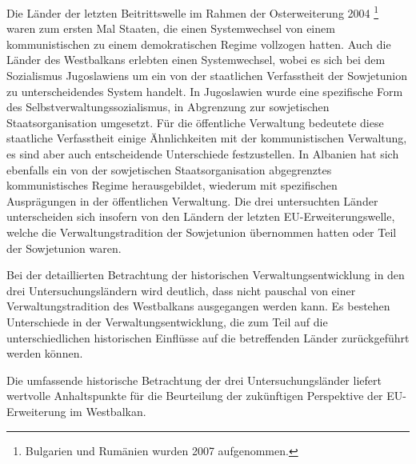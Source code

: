Die Länder der letzten Beitrittswelle im Rahmen der Osterweiterung 2004 \footnote{Bulgarien und Rumänien wurden 2007 aufgenommen.} waren zum ersten Mal Staaten, die einen Systemwechsel von einem kommunistischen zu einem demokratischen Regime vollzogen hatten. Auch die Länder des Westbalkans erlebten einen Systemwechsel, wobei es sich bei dem Sozialismus Jugoslawiens um ein von der staatlichen Verfasstheit der Sowjetunion zu unterscheidendes System handelt. In Jugoslawien wurde eine spezifische Form des Selbstverwaltungssozialismus, in Abgrenzung zur sowjetischen Staatsorganisation umgesetzt. Für die öffentliche Verwaltung bedeutete diese staatliche Verfasstheit einige Ähnlichkeiten mit der kommunistischen Verwaltung, es sind aber auch entscheidende Unterschiede festzustellen. In Albanien hat sich ebenfalls ein von der sowjetischen Staatsorganisation abgegrenztes kommunistisches Regime herausgebildet, wiederum mit spezifischen Ausprägungen in der öffentlichen Verwaltung. Die drei untersuchten Länder unterscheiden sich insofern von den Ländern der letzten EU-Erweiterungswelle, welche die Verwaltungstradition der Sowjetunion übernommen hatten oder Teil der Sowjetunion waren.\par
Bei der detaillierten Betrachtung der historischen Verwaltungsentwicklung in den drei Untersuchungsländern wird deutlich, dass nicht pauschal von einer Verwaltungstradition des Westbalkans ausgegangen werden kann. Es bestehen Unterschiede in der Verwaltungsentwicklung, die zum Teil auf die unterschiedlichen historischen Einflüsse auf die betreffenden Länder zurückgeführt werden können. \par
Die umfassende historische Betrachtung der drei Untersuchungsländer liefert wertvolle Anhaltspunkte für die Beurteilung der zukünftigen Perspektive der EU-Erweiterung im Westbalkan.

